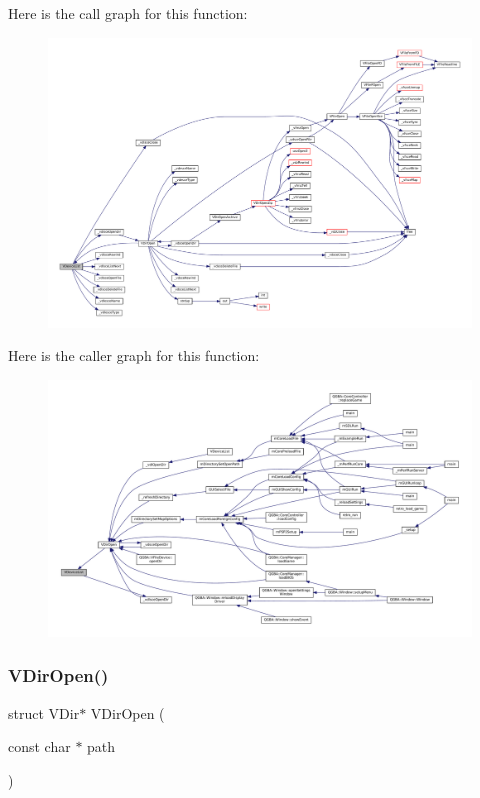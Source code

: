 Here is the call graph for this function\+:
\nopagebreak
\begin{figure}[H]
\begin{center}
\leavevmode
\includegraphics[width=350pt]{sce-vfs_8c_a36b1aed5737fa71dced20925de25a143_cgraph}
\end{center}
\end{figure}
Here is the caller graph for this function\+:
\nopagebreak
\begin{figure}[H]
\begin{center}
\leavevmode
\includegraphics[width=350pt]{sce-vfs_8c_a36b1aed5737fa71dced20925de25a143_icgraph}
\end{center}
\end{figure}
\mbox{\label{sce-vfs_8c_a2966065604f0fcfa278b5246d4d653b9}} 
\subsubsection{\texorpdfstring{V\+Dir\+Open()}{VDirOpen()}}
{\footnotesize\ttfamily struct V\+Dir$\ast$ V\+Dir\+Open (\begin{DoxyParamCaption}\item[{const char $\ast$}]{path }\end{DoxyParamCaption})}

